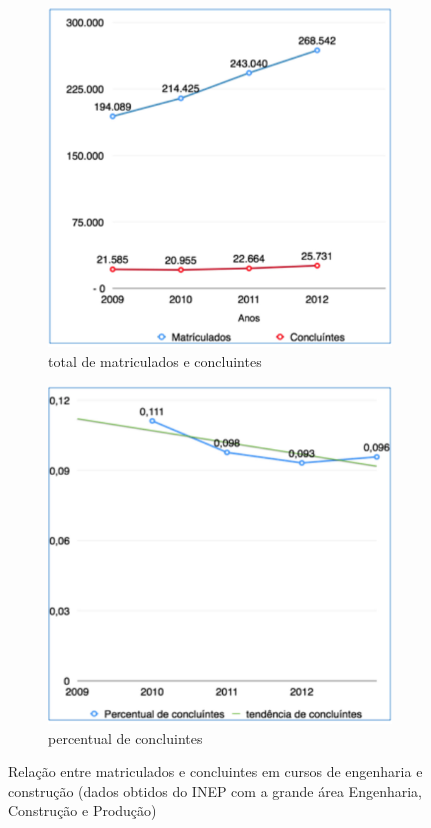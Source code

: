 \begin{figure}
	\begin{subfigure}{.5\textwidth}
  		\centering
  		\includegraphics[width=.9\linewidth]{figuras/matriculados1.eps}
  		\caption{total de matriculados e concluintes}
  		\label{fig:submat1}
	\end{subfigure}%
	\begin{subfigure}{.5\textwidth}
  		\centering
  		\includegraphics[width=.9\linewidth]{figuras/matriculados2.eps}
  		\caption{percentual de concluintes}
  		\label{fig:submat2}
	\end{subfigure}
	\caption{Relação entre matriculados e concluintes em cursos de engenharia e construção
	(dados obtidos do INEP com a grande área Engenharia, Construção e Produção)}
	\label{fig:matriculados}
\end{figure}


